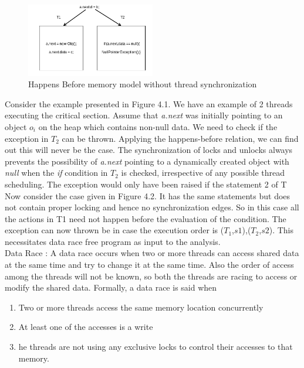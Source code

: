 \begin{figure}[b]
	\centering
	\includegraphics[width=0.5\textwidth]{Figures/sync_no_lock.png}
	\caption{Happens Before memory model without thread synchronization}
	\label{fig:happensbefore2}
\end{figure} 
 
Consider the example presented in Figure 4.1. We have an example of 2 threads executing the critical section. Assume that \emph{a.next} was initially pointing to an object $o_i$ on the heap which contains non-null data. We need to check if the exception in $T_2$ can be thrown. Applying the happens-before relation, we can find out this will never be the case. The synchronization of locks and unlocks always prevents the possibility of \emph{a.next} pointing to a dynamically created object with \emph{null} when the \emph{if} condition in $T_2$ is checked, irrespective of any possible thread scheduling. The exception would only have been raised if the statement 2 of T \\

Now consider the case given in Figure 4.2. It has the same statements but does not contain proper locking and hence no synchronization edges. So in this case all the actions in T1 need not happen before the evaluation of the condition. The exception can now thrown be in case the execution order is {($T_1$,$s1$),($T_2$,$s2$)}. This necessitates data race free program as input to the analysis.\\


Data Race : A data race occurs when two or more threads can access shared data at the same time and try to change it at the same time. Also the order of access among the threads will not be known, so both the threads are racing to access or modify the shared data. Formally, a data race is said when

\begin{enumerate}
	\item Two or more threads access the same memory location concurrently
	\item At least one of the accesses is a write
	\item he threads are not using any exclusive locks to control their accesses to that memory.
\end{enumerate}

